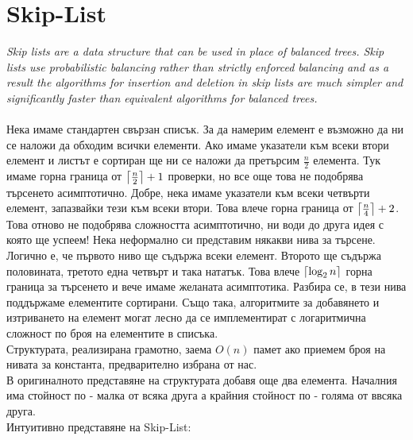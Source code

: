 \documentclass[a4paper,12pt,fleqn]{article}
\DeclarePairedDelimiter\ceil{\lceil}{\rceil}
\begin{document}
	\section{Skip-List}
	\textit{Skip lists are a data structure that can be used in place of balanced trees.
		Skip lists use probabilistic balancing rather than strictly enforced balancing
		and as a result the algorithms for insertion and deletion in skip lists are
		much simpler and significantly faster than equivalent algorithms for
		balanced trees.}\\
	\\Нека имаме стандартен свързан списък. За да намерим елемент е възможно да ни се наложи да обходим всички елементи. Ако имаме указатели към всеки втори елемент и листът е сортиран ще ни се наложи да претърсим $\frac{n}{2}$ елемента. Тук имаме горна граница от $\ceil*{\frac{n}{2}} + 1$ проверки, но все още това не подобрява търсенето асимптотично. Добре, нека имаме указатели към всеки четвърти елемент, запазвайки тези към всеки втори. Това влече горна граница от $\ceil*{\frac{n}{4}} + 2$. Това отново не подобрява сложността асимптотично, ни води до друга идея с която ще успеем! Нека неформално си представим някакви нива за търсене. Логично е, че първото ниво ще съдържа всеки елемент. Второто ще съдържа половината, третото една четвърт и така нататък. Това влече $\ceil*{\log_2{n}}$ горна граница за търсенето и вече имаме желаната асимптотика. Разбира се, в тези нива поддържаме елементите сортирани. Също така, алгоритмите за добавянето и изтриването на елемент могат лесно да се имплементират с логаритмична сложност по броя на елементите в списъка.\\
	Структурата, реализирана грамотно, заема $O(n)$ памет ако приемем броя на нивата за константа, предварително избрана от нас.\\
	В оригиналното представяне на структурата добавя още два елемента. Началния има стойност по - малка от всяка друга а крайния стойност по - голяма от ввсяка друга.\\
	Интуитивно представяне на Skip-List:
	
\end{document}
